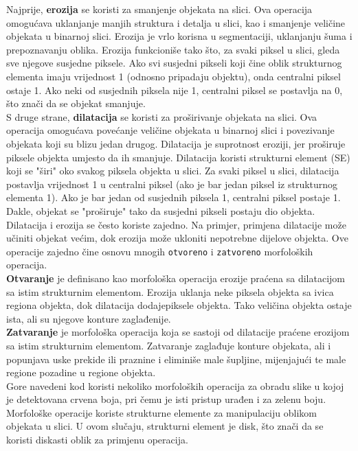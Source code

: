 \documentclass[a4paper,12pt]{article}
\begin{document}
Najprije, \textbf{erozija} se koristi za smanjenje objekata na slici. Ova operacija omogućava uklanjanje manjih struktura i detalja u slici, kao i smanjenje veličine objekata u binarnoj slici.
Erozija je vrlo korisna u segmentaciji, uklanjanju šuma i prepoznavanju oblika. 
Erozija funkcioniše tako što, za svaki piksel u slici, gleda sve njegove susjedne piksele. 
Ako svi susjedni pikseli koji čine oblik strukturnog elementa imaju vrijednost 1 (odnosno pripadaju objektu), onda centralni piksel ostaje 1. Ako neki od susjednih piksela nije 1, centralni piksel se postavlja na 0, što znači da se objekat smanjuje.\\

S druge strane, \textbf{dilatacija} se koristi za proširivanje objekata na slici. 
Ova operacija omogućava povećanje veličine objekata u binarnoj slici i povezivanje objekata koji su blizu jedan drugog. 
Dilatacija je suprotnost eroziji, jer proširuje piksele objekta umjesto da ih smanjuje. 
Dilatacija koristi strukturni element (SE) koji se "širi" oko svakog piksela objekta u slici. 
Za svaki piksel u slici, dilatacija postavlja vrijednost 1 u centralni piksel (ako je bar jedan piksel iz strukturnog elementa 1). 
Ako je bar jedan od susjednih piksela 1, centralni piksel postaje 1. 
Dakle, objekat se "proširuje" tako da susjedni pikseli postaju dio objekta. 
\\
Dilatacija i erozija se često koriste zajedno. Na primjer, primjena dilatacije može učiniti objekat većim, dok erozija može ukloniti nepotrebne dijelove objekta.
 Ove operacije zajedno čine osnovu mnogih \texttt{otvoreno} i \texttt{zatvoreno} morfoloških operacija. \\

\textbf{Otvaranje} je definisano kao morfološka operacija erozije praćena sa dilatacijom sa istim strukturnim elementom. 
Erozija uklanja neke piksela objekta sa ivica regiona objekta, dok dilatacija dodajepiksele objekta. Tako veličina objekta ostaje ista, ali su njegove konture zaglađenije. \\

\textbf{Zatvaranje} je morfološka operacija koja se sastoji od dilatacije praćene erozijom sa istim strukturnim elementom. 
Zatvaranje zaglađuje konture objekata, ali i popunjava uske prekide ili praznine i eliminiše male šupljine, mijenjajući te male regione pozadine u regione objekta.\\

Gore navedeni kod koristi nekoliko morfoloških operacija za obradu slike u kojoj je detektovana crvena boja, pri čemu je isti pristup urađen i za zelenu boju. 
Morfološke operacije koriste strukturne elemente za manipulaciju oblikom objekata u slici. 
U ovom slučaju, strukturni element je disk, što znači da se koristi diskasti oblik za primjenu operacija.
\\
\end{document}
